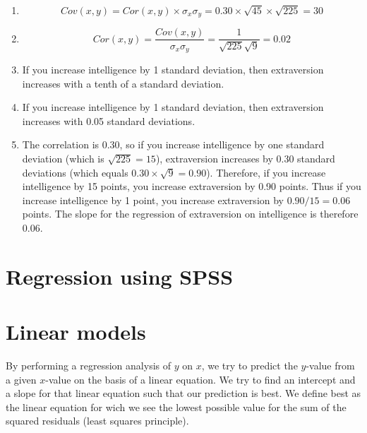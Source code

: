 \documentclass[]{report}\usepackage[]{graphicx}\usepackage[]{color}
\begin{document}
\begin{enumerate}

\item

\begin{equation}
Cov(x,y)= Cor(x,y) \times \sigma_x \sigma_y= 0.30 \times \sqrt{45}\times \sqrt{225}=30
\end{equation}



\item

\begin{equation}
Cor(x,y)= \frac{Cov(x,y)} { \sigma_x \sigma_y}= \frac{1} { \sqrt{225} \sqrt{9}}=0.02
\end{equation}

\item
If you increase intelligence by 1 standard deviation, then extraversion increases with a tenth of a standard deviation.

\item
If you increase intelligence by 1 standard deviation, then extraversion increases with 0.05 standard deviations.

\item
The correlation is 0.30, so if you increase intelligence by one standard deviation (which is $\sqrt{225}=15$), extraversion increases by 0.30 standard deviations (which equals $0.30 \times \sqrt{9}=0.90$). Therefore, if you increase intelligence by 15 points, you increase extraversion by 0.90 points. Thus if you increase intelligence by 1 point, you increase extraversion by $0.90/15=0.06$ points. The slope for the regression of extraversion on intelligence is therefore 0.06.


\end{enumerate}


\section{Regression using SPSS}



\section{Linear models}

By performing a regression analysis of $y$ on $x$, we try to predict the $y$-value from a given $x$-value on the basis of a linear equation. We try to find an intercept and a slope for that linear equation such that our prediction is best. We define best as the linear equation for wich we see the lowest possible value for the sum of the squared residuals (least squares principle).
\end{document}
